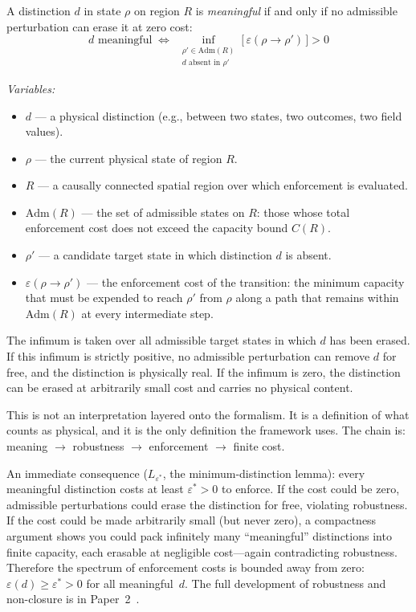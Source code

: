\documentclass[11pt]{article}
\newcommand{\Adm}{\mathrm{Adm}}
\begin{document}
\begin{tcolorbox}[apfbox, title={Definition (Robustness Under Perturbation)}]
A distinction $d$ in state $\rho$ on region $R$ is \emph{meaningful} if and only if no admissible perturbation can erase it at zero cost:
\[
d \text{ meaningful} \;\iff\; \inf_{\substack{\rho' \in \Adm(R) \\ d \text{ absent in } \rho'}} \bigl[\, \varepsilon(\rho \to \rho') \,\bigr] > 0
\]

\smallskip\noindent\textit{Variables:}
\begin{itemize}[nosep,leftmargin=2em]
\item $d$ --- a physical distinction (e.g., between two states, two outcomes, two field values).
\item $\rho$ --- the current physical state of region $R$.
\item $R$ --- a causally connected spatial region over which enforcement is evaluated.
\item $\Adm(R)$ --- the set of admissible states on $R$: those whose total enforcement cost does not exceed the capacity bound $C(R)$.
\item $\rho'$ --- a candidate target state in which distinction $d$ is absent.
\item $\varepsilon(\rho \to \rho')$ --- the enforcement cost of the transition: the minimum capacity that must be expended to reach $\rho'$ from $\rho$ along a path that remains within $\Adm(R)$ at every intermediate step.
\end{itemize}

\smallskip\noindent
The infimum is taken over all admissible target states in which $d$ has been erased.  If this infimum is strictly positive, no admissible perturbation can remove $d$ for free, and the distinction is physically real.  If the infimum is zero, the distinction can be erased at arbitrarily small cost and carries no physical content.
\end{tcolorbox}

This is not an interpretation layered onto the formalism.  It is a definition of what counts as physical, and it is the only definition the framework uses.  The chain is: meaning $\to$ robustness $\to$ enforcement $\to$ finite cost.

An immediate consequence ($L_{\varepsilon^*}$, the minimum-distinction lemma): every meaningful distinction costs at least $\varepsilon^* > 0$ to enforce.  If the cost could be zero, admissible perturbations could erase the distinction for free, violating robustness.  If the cost could be made arbitrarily small (but never zero), a compactness argument shows you could pack infinitely many ``meaningful'' distinctions into finite capacity, each erasable at negligible cost---again contradicting robustness.  Therefore the spectrum of enforcement costs is bounded away from zero: $\varepsilon(d) \ge \varepsilon^* > 0$ for all meaningful~$d$.  The full development of robustness and non-closure is in Paper~2~\cite{P2}.
\end{document}
